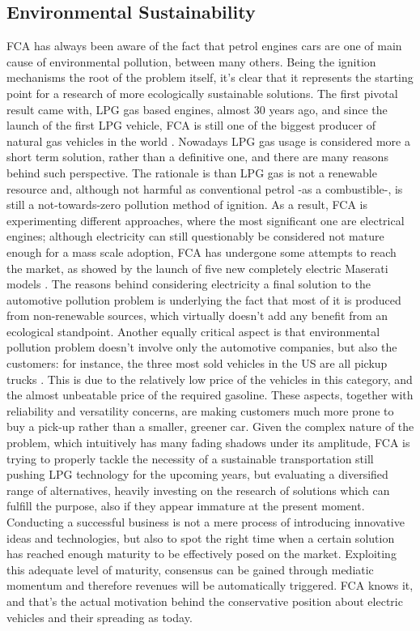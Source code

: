 \subsection{Environmental Sustainability}
FCA has always been aware of the fact that petrol engines cars are one of main cause of environmental pollution, between many others. Being the ignition mechanisms the root of the problem itself, it's clear that it represents the starting point for a research of more ecologically sustainable solutions.
The first pivotal result came with, LPG gas based engines, almost 30 years ago, and since the launch of the first LPG vehicle, FCA is still one of the biggest producer of natural gas vehicles in the world \cite{FCA_sustainability}.
Nowadays LPG gas usage is considered more a short term solution, rather than a definitive one, and there are many reasons behind such perspective. The rationale is than LPG gas is not a renewable resource and, although not harmful as conventional petrol -as a combustible-, is still a not-towards-zero pollution method of ignition. As a result, FCA is experimenting different approaches, where the most significant one are electrical engines; although electricity can still questionably be considered not mature enough for a mass scale adoption, FCA has undergone some attempts to reach the market, as showed by the launch of five new completely electric Maserati models \cite{Maserati_electric}. The reasons behind considering electricity a final solution to the automotive pollution problem is underlying the fact that most of it is produced from non-renewable sources, which virtually doesn't add any benefit from an ecological standpoint.
Another equally critical aspect is that environmental pollution problem doesn't involve only the automotive companies, but also the customers: for instance, the three most sold vehicles in the US are all pickup trucks \cite{US_best-selling-vehicle}. This is due to the relatively low price of the vehicles in this category, and the almost unbeatable price of the required gasoline. These aspects, together with reliability and versatility concerns, are making customers much more prone to buy a pick-up rather than a smaller, greener car.
Given the complex nature of the problem, which intuitively has many fading shadows under its amplitude, FCA is trying to properly tackle the necessity of a sustainable transportation still pushing LPG technology for the upcoming years, but evaluating a diversified range of alternatives, heavily investing on the research of solutions which can fulfill the purpose, also if they appear immature at the present moment.
Conducting a successful business is not a mere process of introducing innovative ideas and technologies, but also to spot the right time when a certain solution has reached enough maturity to be effectively posed on the market. Exploiting this adequate level of maturity, consensus can be gained through mediatic momentum and therefore revenues will be automatically triggered. FCA knows it, and that's the actual motivation behind the conservative position about electric vehicles and their spreading as today.

